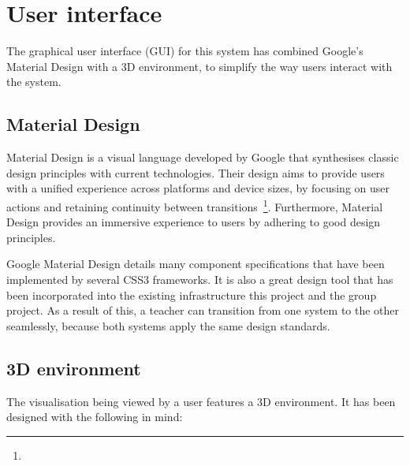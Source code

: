 

\section{User interface} {
\label{sec:user_interface}

	The graphical user interface (GUI) for this system has combined Google's Material Design with a 3D environment, to simplify the way users interact with the system.

	\subsection{Material Design} {
	\label{sec:material_design}

		Material Design is a visual language developed by Google that synthesises classic design principles with current technologies. Their design aims to provide users with a unified experience across platforms and device sizes, by focusing on user actions and retaining continuity between transitions~\footnote{}. Furthermore, Material Design provides an immersive experience to users by adhering to good design principles.

		Google Material Design details many component specifications that have been implemented by several CSS3 frameworks. It is also a great design tool that has been incorporated into the existing infrastructure this project and the group project. As a result of this, a teacher can transition from one system to the other seamlessly, because both systems apply the same design standards.

	}

	\subsection{3D environment} {
	\label{sec:3d_environment}

		The visualisation being viewed by a user features a 3D environment. It has been designed with the following in mind:

}}
